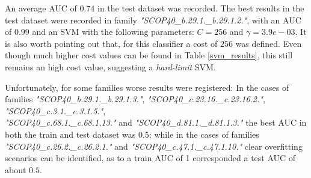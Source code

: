 \documentclass[11pt]{article}
\begin{document}
An average AUC of $0.74$ in the test dataset was recorded. The best results in the test dataset were recorded in family \emph{"SCOP40\_b.29.1.\_b.29.1.2."}, with an AUC of $0.99$ and an SVM with the following parameters: $C = 256$ and $\gamma = 3.9e-03$. It is also worth pointing out that, for this classifier a cost of $256$ was defined. Even though much higher cost values can be found in Table \ref{svm_results}, this still remains an high cost value, suggesting a \emph{hard-limit} SVM.

Unfortunately, for some families worse results were registered: In the cases of families \emph{"SCOP40\_b.29.1.\_b.29.1.3."}, \emph{"SCOP40\_c.23.16.\_c.23.16.2."}, \emph{"SCOP40\_c.3.1.\_c.3.1.5."},\\\emph{"SCOP40\_c.68.1.\_c.68.1.13."} and \emph{"SCOP40\_d.81.1.\_d.81.1.3."} the best AUC in both the train and test dataset was $0.5$; while in the cases of families \emph{"SCOP40\_c.26.2.\_c.26.2.1."} and \emph{"SCOP40\_c.47.1.\_c.47.1.10."} clear overfitting scenarios can be identified, as to a train AUC of 1 corresponded a test AUC of about $0.5$.
\end{document}
